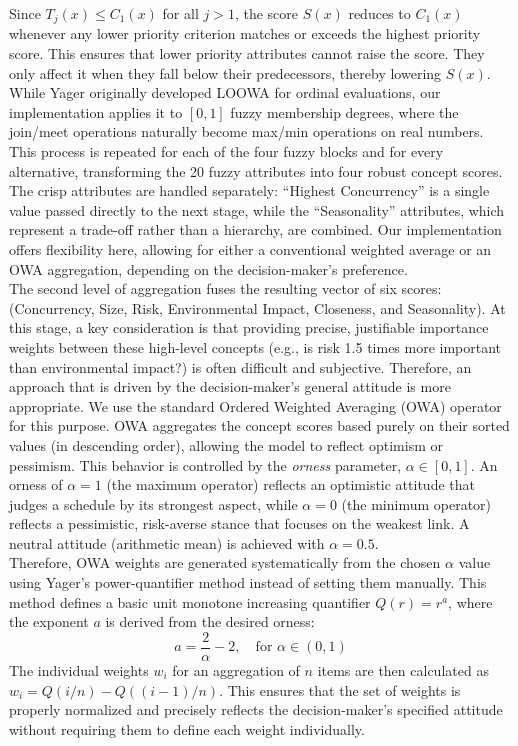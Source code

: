 Since $T_j(x) \leq C_1(x)$ for all $j>1$, the score $S(x)$ reduces to $C_1(x)$ whenever any lower priority criterion matches or exceeds the highest priority score. This ensures that lower priority attributes cannot raise the score. They only affect it when they fall below their predecessors, thereby lowering $S(x)$. While Yager originally developed LOOWA for ordinal evaluations, our implementation applies it to $[0,1]$ fuzzy membership degrees, where the join/meet operations naturally become max/min operations on real numbers.
This process is repeated for each of the four fuzzy blocks and for every alternative, transforming the 20 fuzzy attributes into four robust concept scores. The crisp attributes are handled separately: ``Highest Concurrency'' is a single value passed directly to the next stage, while the ``Seasonality'' attributes, which represent a trade-off rather than a hierarchy, are combined. Our implementation offers flexibility here, allowing for either a conventional weighted average or an OWA aggregation, depending on the decision-maker's preference. %
\\

The second level of aggregation fuses the resulting vector of six scores: (Concurrency, Size, Risk, Environmental Impact, Closeness, and Seasonality). At this stage, a key consideration is that providing precise, justifiable importance weights between these high-level concepts (e.g., is risk 1.5 times more important than environmental impact?) is often difficult and subjective. Therefore, an approach that is driven by the decision-maker's general attitude is more appropriate. We use the standard Ordered Weighted Averaging (OWA) operator for this purpose. OWA aggregates the concept scores based purely on their sorted values (in descending order), allowing the model to reflect optimism or pessimism. This behavior is controlled by the \textit{orness} parameter, $\alpha \in [0, 1]$. An orness of $\alpha=1$ (the maximum operator) reflects an optimistic attitude that judges a schedule by its strongest aspect, while $\alpha=0$ (the minimum operator) reflects a pessimistic, risk-averse stance that focuses on the weakest link. A neutral attitude (arithmetic mean) is achieved with $\alpha=0.5$.\\

Therefore, OWA weights are generated systematically from the chosen $\alpha$ value using Yager's power-quantifier method instead of setting them manually. This method defines a basic unit monotone increasing quantifier $Q(r) = r^a$, where the exponent $a$ is derived from the desired orness:
\begin{equation}
a = \frac{2}{\alpha} - 2, \quad \text{for } \alpha \in (0, 1)
\end{equation}
The individual weights $w_i$ for an aggregation of $n$ items are then calculated as $w_i = Q(i/n) - Q((i-1)/n)$. This ensures that the set of weights is properly normalized and precisely reflects the decision-maker's specified attitude without requiring them to define each weight individually.
\\

